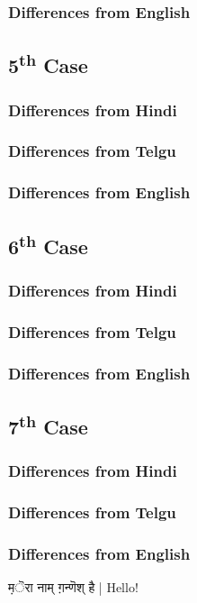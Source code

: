 \documentclass[a4paper,10pt]{article}
\begin{document}
\subsubsection{Differences from English}
\subsection{5\textsuperscript{th} Case}
\subsubsection{Differences from Hindi}
\subsubsection{Differences from Telgu}
\subsubsection{Differences from English}
\subsection{6\textsuperscript{th} Case}
\subsubsection{Differences from Hindi}
\subsubsection{Differences from Telgu}
\subsubsection{Differences from English}
\subsection{7\textsuperscript{th} Case}
\subsubsection{Differences from Hindi}
\subsubsection{Differences from Telgu}
\subsubsection{Differences from English}
{\d मॆरा नाम् ग़न्णॆश् है |} Hello!
\end{document}
